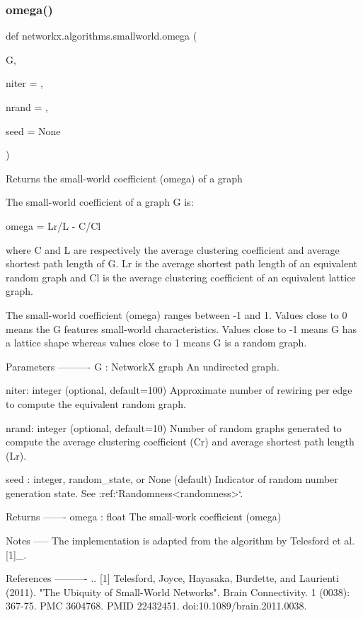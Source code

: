 \subsubsection{\texorpdfstring{omega()}{omega()}}
{\footnotesize\ttfamily def networkx.\+algorithms.\+smallworld.\+omega (\begin{DoxyParamCaption}\item[{}]{G,  }\item[{}]{niter = {},  }\item[{}]{nrand = {},  }\item[{}]{seed = {\ttfamily None} }\end{DoxyParamCaption})}

\begin{DoxyVerb}Returns the small-world coefficient (omega) of a graph

The small-world coefficient of a graph G is:

omega = Lr/L - C/Cl

where C and L are respectively the average clustering coefficient and
average shortest path length of G. Lr is the average shortest path length
of an equivalent random graph and Cl is the average clustering coefficient
of an equivalent lattice graph.

The small-world coefficient (omega) ranges between -1 and 1. Values close
to 0 means the G features small-world characteristics. Values close to -1
means G has a lattice shape whereas values close to 1 means G is a random
graph.

Parameters
----------
G : NetworkX graph
    An undirected graph.

niter: integer (optional, default=100)
    Approximate number of rewiring per edge to compute the equivalent
    random graph.

nrand: integer (optional, default=10)
    Number of random graphs generated to compute the average clustering
    coefficient (Cr) and average shortest path length (Lr).

seed : integer, random_state, or None (default)
    Indicator of random number generation state.
    See :ref:`Randomness<randomness>`.


Returns
-------
omega : float
    The small-work coefficient (omega)

Notes
-----
The implementation is adapted from the algorithm by Telesford et al. [1]_.

References
----------
.. [1] Telesford, Joyce, Hayasaka, Burdette, and Laurienti (2011).
       "The Ubiquity of Small-World Networks".
       Brain Connectivity. 1 (0038): 367-75.  PMC 3604768. PMID 22432451.
       doi:10.1089/brain.2011.0038.
\end{DoxyVerb}
 \mbox{\label{namespacenetworkx_1_1algorithms_1_1smallworld_a23c9e5c3fcdbc8f107bbbdddeb45ba9e}} 
